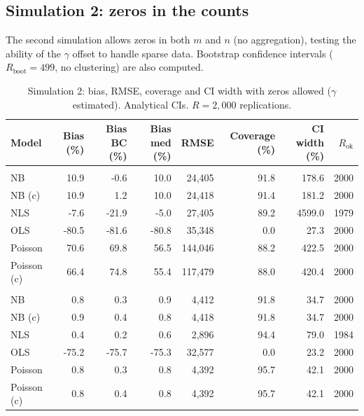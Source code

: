 \clearpage

\subsection{Simulation 2: zeros in the counts}\label{sec-appendix-sim2}

The second simulation allows zeros in both $m$ and $n$ (no aggregation),
testing the ability of the $\gamma$ offset to handle sparse data.
Bootstrap confidence intervals ($R_{\text{boot}} = 499$, no clustering)
are also computed.


\begin{table}[ht!]
\caption{\label{tbl-sim2-analytical}Simulation 2: bias, RMSE, coverage and CI width with zeros allowed ($\gamma$ estimated). Analytical CIs. $R = 2{,}000$ replications.} 
\fontsize{7.0pt}{8.0pt}\selectfont
\begin{tabular*}{\linewidth}{@{\extracolsep{\fill}}lrrrrrrr}
\toprule
Model & Bias (\%) & Bias BC (\%) & Bias med (\%) & RMSE & Coverage (\%) & CI width (\%) & $R_{\text{ok}}$ \\ 
\midrule\addlinespace[2.5pt]
\multicolumn{8}{l}{NB($n$)-NB($m$)} \\[2.5pt] 
\midrule\addlinespace[2.5pt]
NB & 10.9 & -0.6 & 10.0 & 24,405 & 91.8 & 178.6 & 2000 \\ 
NB (c) & 10.9 & 1.2 & 10.0 & 24,418 & 91.4 & 181.2 & 2000 \\ 
NLS & -7.6 & -21.9 & -5.0 & 27,405 & 89.2 & 4599.0 & 1979 \\ 
OLS & -80.5 & -81.6 & -80.8 & 35,348 & 0.0 & 27.3 & 2000 \\ 
Poisson & 70.6 & 69.8 & 56.5 & 144,046 & 88.2 & 422.5 & 2000 \\ 
Poisson (c) & 66.4 & 74.8 & 55.4 & 117,479 & 88.0 & 420.4 & 2000 \\ 
\midrule\addlinespace[2.5pt]
\multicolumn{8}{l}{NB($n$)-Po($m$)} \\[2.5pt] 
\midrule\addlinespace[2.5pt]
NB & 0.8 & 0.3 & 0.9 & 4,412 & 91.8 & 34.7 & 2000 \\ 
NB (c) & 0.9 & 0.4 & 0.8 & 4,418 & 91.8 & 34.7 & 2000 \\ 
NLS & 0.4 & 0.2 & 0.6 & 2,896 & 94.4 & 79.0 & 1984 \\ 
OLS & -75.2 & -75.7 & -75.3 & 32,577 & 0.0 & 23.2 & 2000 \\ 
Poisson & 0.8 & 0.3 & 0.8 & 4,392 & 95.7 & 42.1 & 2000 \\ 
Poisson (c) & 0.8 & 0.4 & 0.8 & 4,392 & 95.7 & 42.1 & 2000 \\ 

\end{tabular*}
\end{table}
